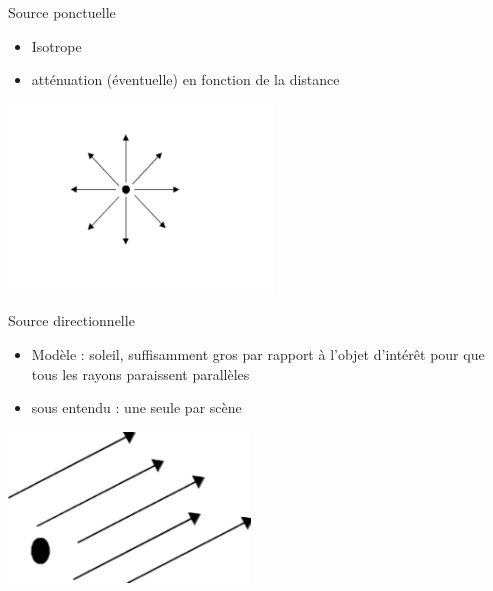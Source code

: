 \begin{frame}[t]{Source ponctuelle}
  \begin{itemize}
    \item Isotrope
    \item atténuation (éventuelle) en fonction de la distance
  \end{itemize}
    \begin{center}
      \includegraphics[height=5cm]{figs/src-ponctuelle.pdf}
      \end{center}
\end{frame}

\begin{frame}[t]{Source directionnelle}
  \begin{itemize}
    \item Modèle : soleil, suffisamment gros par rapport à l'objet d'intérêt pour que tous les rayons paraissent parallèles
    \item sous entendu : une seule par scène
  \end{itemize}
    \begin{center}
      \includegraphics[height=4cm]{figs/src-dir.pdf}
      \end{center}
\end{frame}

